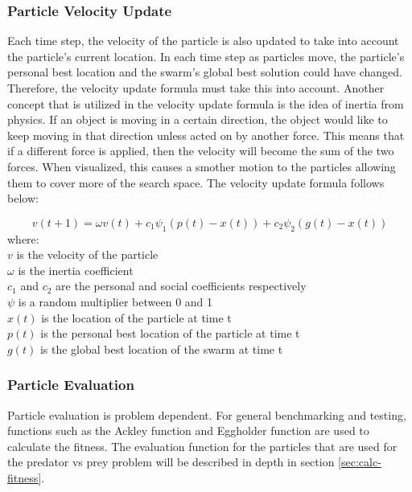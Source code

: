 \subsubsection{Particle Velocity Update}
Each time step, the velocity of the particle is also updated to take into account the particle's current location. In each time step as particles move, the particle's personal best location and the swarm's global best solution could have changed. Therefore, the velocity update formula must take this into account. Another concept that is utilized in the velocity update formula is the idea of inertia from physics. If an object is moving in a certain direction, the object would like to keep moving in that direction unless acted on by another force. This means that if a different force is applied, then the velocity will become the sum of the two forces. When visualized, this causes a smother motion to the particles allowing them to cover more of the search space. The velocity update formula follows below:

\begin{equation} \label{eqn:vel-update-formula}
  v(t+1) = \omega v(t) + c_1 \psi_1  (p(t) - x(t)) + c_2 \psi_2  (g(t) - x(t)) 
\end{equation}
where:\\
\indent $v$ is the velocity of the particle\\
\indent $\omega$ is the inertia coefficient\\
\indent $c_1$ and $c_2$ are the personal and social coefficients respectively\\
\indent $\psi$ is a random multiplier between 0 and 1\\
\indent $x(t)$ is the location of the particle at time t\\
\indent $p(t)$ is the personal best location of the particle at time t\\
\indent $g(t)$ is the global best location of the swarm at time t




\subsubsection{Particle Evaluation}
Particle evaluation is problem dependent. For general benchmarking and testing, functions such as the Ackley function and Eggholder function are used to calculate the fitness. The evaluation function for the particles that are used for the predator vs prey problem will be described in depth in section \ref{sec:calc-fitness}.

